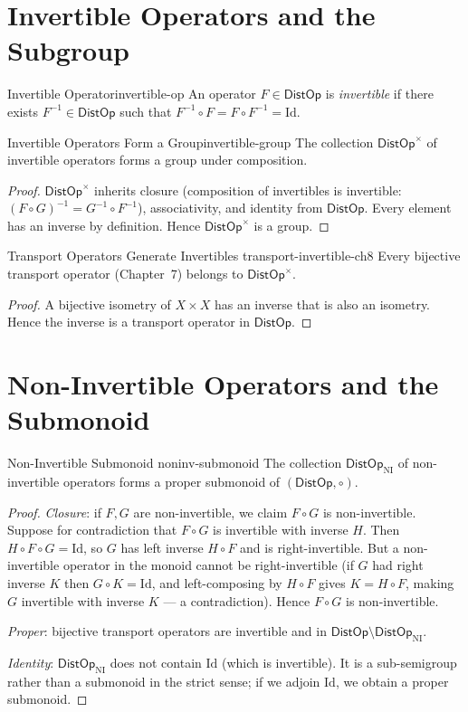 \documentclass[12pt,twoside,openright]{book}
\newcommand{\distPairs}{X\times X}
\newcommand{\distOp}{\mathsf{DistOp}}
\providecommand{\distOpNI}{\distOp_{\mathrm{NI}}}
\providecommand{\distOpInv}{\distOp^{\times}}
\begin{document}
\section{Invertible Operators and the Subgroup}

\begin{definition}{Invertible Operator}{invertible-op}
An operator $F\in\distOp$ is \emph{invertible} if there exists
$F^{-1}\in\distOp$ such that $F^{-1}\circ F=F\circ F^{-1}=
\mathrm{Id}$.
\end{definition}

\begin{theorem}{Invertible Operators Form a Group}{invertible-group}
The collection $\distOpInv$ of invertible operators forms a
group under composition.
\begin{proof}
$\distOpInv$ inherits closure (composition of invertibles is
invertible: $(F\circ G)^{-1}=G^{-1}\circ F^{-1}$),
associativity, and identity from $\distOp$. Every element has
an inverse by definition. Hence $\distOpInv$ is a group.
\end{proof}
\end{theorem}

\begin{proposition}{Transport Operators Generate Invertibles}%
  {transport-invertible-ch8}
Every bijective transport operator (Chapter~7) belongs to
$\distOpInv$.
\begin{proof}
A bijective isometry of $\distPairs$ has an inverse that is
also an isometry. Hence the inverse is a transport operator
in $\distOp$.
\end{proof}
\end{proposition}

\section{Non-Invertible Operators and the Submonoid}

\begin{theorem}{Non-Invertible Submonoid}%
  {noninv-submonoid}
The collection $\distOpNI$ of non-invertible operators forms
a proper submonoid of $(\distOp,\circ)$.
\begin{proof}
\emph{Closure}: if $F,G$ are non-invertible, we claim $F\circ G$
is non-invertible. Suppose for contradiction that $F\circ G$
is invertible with inverse $H$. Then $H\circ F\circ G=
\mathrm{Id}$, so $G$ has left inverse $H\circ F$ and is
right-invertible. But a non-invertible operator in the monoid
cannot be right-invertible (if $G$ had right inverse $K$ then
$G\circ K=\mathrm{Id}$, and left-composing by $H\circ F$
gives $K=H\circ F$, making $G$ invertible with inverse $K$ ---
a contradiction). Hence $F\circ G$ is non-invertible.

\emph{Proper}: bijective transport operators are invertible
and in $\distOp\setminus\distOpNI$.

\emph{Identity}: $\distOpNI$ does not contain $\mathrm{Id}$
(which is invertible). It is a sub-semigroup rather than a
submonoid in the strict sense; if we adjoin $\mathrm{Id}$, we
obtain a proper submonoid.
\end{proof}
\end{theorem}
\end{document}
